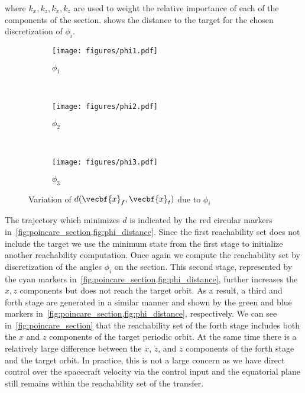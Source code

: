 where \( k_x, k_z, k_{\dot{x}}, k_{\dot{z}} \) are used to weight the relative importance of each of the components of the \Poincare section.
 shows the distance to the target for the chosen discretization of \( \phi_i \).
\begin{figure}[htbp] 
    \centering 
    \begin{subfigure}[htbp]{0.3\textwidth} 
        \texttt{[image: figures/phi1.pdf]} 
        \caption{ \( \phi_1 \)} \label{fig:phi1} 
    \end{subfigure}~
    \begin{subfigure}[htbp]{0.3\textwidth} 
        \texttt{[image: figures/phi2.pdf]} 
        \caption{\( \phi_2 \)} \label{fig:phi2} 
    \end{subfigure}~
    \begin{subfigure}[htbp]{0.3\textwidth} 
        \texttt{[image: figures/phi3.pdf]} 
        \caption{\( \phi_3 \)} \label{fig:phi3} 
    \end{subfigure} 
    \caption{Variation of \(d(\vecbf{x}_f,\vecbf{x}_t)\) due to \( \phi_i\)}
    \label{fig:phi_distance} 
\end{figure}

The trajectory which minimizes \( d \) is indicated by the red circular markers in~\cref{fig:poincare_section,fig:phi_distance}.
Since the first reachability set does not include the target we use the minimum state from the first stage to initialize another reachability computation.
Once again we compute the reachability set by discretization of the angles \( \phi_i \) on the \Poincare section.
This second stage, represented by the cyan markers in~\cref{fig:poincare_section,fig:phi_distance}, further increases the \( x, z\) components but does not reach the target orbit.
As a result, a third and forth stage are generated in a similar manner and shown by the green and blue markers in~\cref{fig:poincare_section,fig:phi_distance}, respectively.
We can see in~\cref{fig:poincare_section} that the reachability set of the forth stage includes both the \( x \) and \( z\) components of the target periodic orbit.
At the same time there is a relatively large difference between the \( \dot{x} \), \( \dot{z} \), and \( z \) components of the forth stage and the target orbit.
In practice, this is not a large concern as we have direct control over the spacecraft velocity via the control input and the equatorial plane still remains within the reachability set of the transfer.

